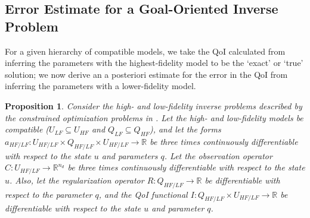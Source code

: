 \documentclass[review,sort&compress]{elsarticle}
\newcommand{\Reals}{{\mathbb{R}}}
\newtheorem{proposition}{Proposition}
\providecommand{\DIFaddtex}[1]{{\protect\color{blue} \sf #1}} %
\providecommand{\DIFaddbegin}{} %
\providecommand{\DIFaddend}{} %
\providecommand{\DIFadd}[1]{\texorpdfstring{\DIFaddtex{#1}}{#1}} %
\newcommand{\DIFaddincludegraphics}[2][]{{\color{blue}\fbox{\DIFOincludegraphics[#1]{#2}}}} %
\DeclareRobustCommand{\DIFaddbegin}{\DIFOaddbegin \let\includegraphics\DIFaddincludegraphics} %
\DeclareRobustCommand{\DIFaddend}{\DIFOaddend \let\includegraphics\DIFOincludegraphics} %
\begin{document}
\subsection[Error Estimate for a Goal-Oriented Inverse Problem]{Error Estimate for a Goal-Oriented Inverse Problem}  \label{sec:deriv}
%
For a given hierarchy of \DIFaddbegin \DIFadd{compatible }\DIFaddend models, we take the QoI calculated from inferring the parameters with the highest-fidelity model to be the `exact' or `true' solution; we now derive an a posteriori estimate for the error in the QoI from inferring the parameters with a lower-fidelity model.
%
\begin{proposition}
\label{thm:error_estimate}
Consider the high- and low-fidelity inverse problems described by the constrained optimization problems in . Let the \DIFaddbegin \DIFadd{high- and low-fidelity models be compatible ($U_{LF}\subseteq U_{HF}$ and $Q_{LF}\subseteq Q_{HF}$), and let the }\DIFaddend forms $a_{HF/LF}:U_{HF/LF} \times Q_{HF/LF} \times U_{HF/LF} \to \Reals$ be three times continuously differentiable with respect to the state $u$ and parameters $q$. Let the observation operator $C:U_{HF/LF}\to\Reals^{n_d}$ be three times continuously differentiable with respect to the state $u$. Also, let the regularization operator $R:Q_{HF/LF}\to\Reals$ be differentiable with respect to the parameter $q$, and the QoI functional $I:Q_{HF/LF}\times U_{HF/LF}\to\Reals$ be differentiable with respect to the state $u$ and parameter $q$.


\end{proposition}
\end{document}
